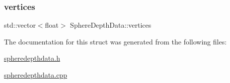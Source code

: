\mbox{\label{struct_sphere_depth_data_a139a9131aa15308e012fc8190de2011d}} 
\subsubsection{\texorpdfstring{vertices}{vertices}}
{\footnotesize\ttfamily std\+::vector$<$float$>$ Sphere\+Depth\+Data\+::vertices\hspace{0.3cm}{\ttfamily [private]}}



The documentation for this struct was generated from the following files\+:\begin{DoxyCompactItemize}
\item 
\hyperlink{spheredepthdata_8h}{spheredepthdata.\+h}\item 
\hyperlink{spheredepthdata_8cpp}{spheredepthdata.\+cpp}\end{DoxyCompactItemize}
